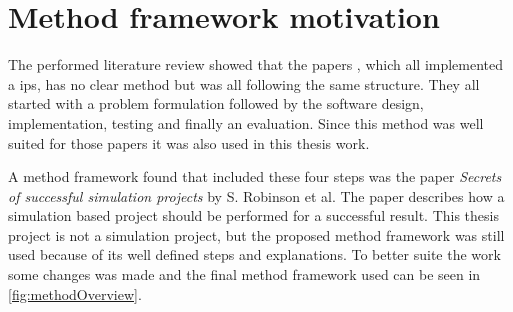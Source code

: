 \section{Method framework motivation}\label{sec:methodFramework}

The performed literature review showed that the papers \cite{BluetoothLowEnergy2018, DevelopmentSmartphoneBasedUniversity2021, PracticalFingerprintingLocalization2017}, which all implemented a \acrlong{ips}, has no clear method but was all following the same structure.
They all started with a problem formulation followed by the software design, implementation, testing and finally an evaluation.
Since this method was well suited for those papers it was also used in this thesis work.

\bigskip

A method framework found that included these four steps was the paper \textit{Secrets of successful simulation projects} \cite{SecretsSuccessfulSimulation1995} by S. Robinson et al.
The paper describes how a simulation based project should be performed for a successful result.
This thesis project is not a simulation project, but the proposed method framework  was still used because of its well defined steps and explanations.
To better suite the work some changes was made and the final method framework used can be seen in \cref{fig:methodOverview}.



